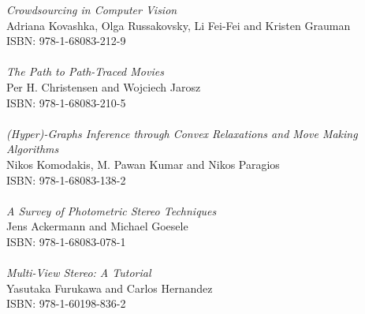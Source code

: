 \vspace{12pt}
\noindent \textit{Crowdsourcing in Computer Vision}\\
Adriana Kovashka, Olga Russakovsky, Li Fei-Fei and Kristen Grauman\\
ISBN: 978-1-68083-212-9\\
\\
\noindent \textit{The Path to Path-Traced Movies}\\
Per H. Christensen and Wojciech Jarosz\\
ISBN: 978-1-68083-210-5\\
\\
\noindent \textit{(Hyper)-Graphs Inference through Convex Relaxations and Move Making Algorithms}\\
Nikos Komodakis, M. Pawan Kumar and Nikos Paragios\\
ISBN: 978-1-68083-138-2\\
\\
\noindent \textit{A Survey of Photometric Stereo Techniques}\\
Jens Ackermann and Michael Goesele\\
ISBN: 978-1-68083-078-1\\
\\
\noindent \textit{Multi-View Stereo: A Tutorial}\\
Yasutaka Furukawa and Carlos Hernandez\\
ISBN: 978-1-60198-836-2